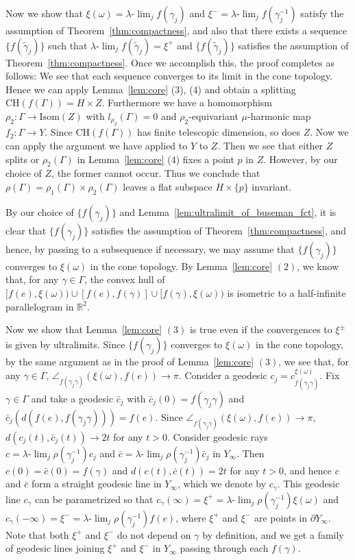 \documentclass[12pt]{amsart}
\numberwithin{equation}{section}
\theoremstyle{plain}
\theoremstyle{definition}
\theoremstyle{remark}
\newcommand{\R}{{\mathbb R}}
\newcommand{\isom}[1]{\mathrm{Isom}({#1})}
\newcommand{\ulim}{\lambda{\text{-}}\!\lim}
\newcommand{\ray}[1]{[#1)}
\newcommand{\cc}[2]{c_{#1}^{#2}}
\newcommand{\ch}[1]{\mathrm{CH}(#1)}
\begin{document}
 Now we show that $\xi(\omega)=\ulim_j f(\gamma_j)$ and 
 $\xi^-=\ulim_j f(\gamma_j^{-1})$
 satisfy the assumption of Theorem~\ref{thm:compactness}, and also that 
 there exists a sequence $\{f(\tilde \gamma_j)\}$ such that 
 $\ulim_j f(\tilde \gamma_j)=\xi^+$ and $\{f(\tilde \gamma_j)\}$
 satisfies the assumption of Theorem~\ref{thm:compactness}. 
 Once we accomplish this, the proof completes as follows:  
 We see that each sequence converges to its limit in the cone topology.
 Hence we can apply Lemma~\ref{lem:core} (3), (4) and 
 obtain a splitting $\ch{f(\Gamma)}=H\times Z$.
 Furthermore we have a homomorphism 
 $\rho_2\colon \Gamma \rightarrow \isom{Z}$ with $l_{\rho_2}(\Gamma)=0$
 and $\rho_2$-equivariant $\mu$-harmonic map 
 $f_2 \colon \Gamma \rightarrow Y$. 
 Since $\ch{f(\Gamma)}$ has finite telescopic dimension, so does $Z$.
 Now we can apply the argument we have applied to $Y$ to $Z$.
 Then we see that either $Z$ splits or $\rho_2(\Gamma)$ in
 Lemma~\ref{lem:core} (4) fixes a point $p$ in $Z$.
 However, by our choice of $Z$, the former cannot occur. 
 Thus we conclude that 
 $\rho(\Gamma)=\rho_1(\Gamma)\times \rho_2(\Gamma)$ leaves 
 a flat subspace $H\times \{p\}$ invariant.

 By our choice of $\{f(\gamma_j)\}$ and
 Lemma~\ref{lem:ultralimit_of_buseman_fct}, it is clear that 
 $\{f(\gamma_j)\}$ satisfies the assumption of
 Theorem~\ref{thm:compactness}, and hence, by passing to a subsequence
 if necessary, we may assume that $\{f(\gamma_j)\}$ converges to
 $\xi(\omega)$ in the cone topology. 
 By Lemma~\ref{lem:core} $(2)$, we know that, for any
 $\gamma \in \Gamma$, the convex hull of 
 $\ray{f(e),\xi(\omega)}\cup [f(e),f(\gamma)]\cup
 \ray{f(\gamma),\xi(\omega)}$ 
 is isometric to a half-infinite parallelogram in $\R^2$.

 Now we show that Lemma~\ref{lem:core} $(3)$ is true even if the
 convergences to $\xi^{\pm}$ is given by ultralimits.
 Since $\{f(\gamma_j)\}$ converges to $\xi(\omega)$ in the cone
  topology, by the same argument as in the proof of Lemma~\ref{lem:core}
 $(3)$,
 we see that, for any $\gamma \in\Gamma$, 
 $\angle_{f(\gamma_{j} \gamma)} (\xi(\omega),f(e))\to \pi$. 
 Consider a geodesic 
 $c_j=\cc{f(\gamma_j\gamma)}{\xi(\omega)}$.
 Fix $\gamma \in \Gamma$ and 
 take a geodesic $\bar c_j$ with $\bar c_j(0)=f(\gamma_j \gamma)$ and 
 $\bar c_j(d(f(e),f(\gamma_j \gamma)))=f(e)$. 
 Since $\angle_{f(\gamma_{j} \gamma)} (\xi(\omega),f(e))\to \pi$, 
 $d(c_j(t), \bar c_j(t)) \to 2t$ for any $t>0$. 
 Consider geodesic rays  $c=\ulim_j \rho(\gamma_j^{-1})c_j$ and 
 $\bar c = \ulim_j \rho(\gamma_j^{-1})\bar c_j$ in $Y_{\infty}$. 
 Then $c(0)=\bar c(0)=f(\gamma)$ and $d(c(t),\bar c(t))=2t$ for any 
 $t>0$, and hence $c$ and $\bar c$ form a straight geodesic line in
 $Y_{\infty}$, which we denote by $c_{\gamma}$. 
 This geodesic line $c_{\gamma}$ can be parametrized so that
 $c_{\gamma}(\infty)=\xi^+ = \ulim_j \rho(\gamma_j^{-1})\xi(\omega)$ and 
 $c_{\gamma}(-\infty)=\xi^- = \ulim_j \rho(\gamma_j^{-1})f(e)$, where 
 $\xi^+$ and $\xi^-$ are points in $\partial Y_{\infty}$.  
 Note that both $\xi^+$ and $\xi^-$ do not depend on $\gamma$ by
 definition, and we get a family of geodesic lines joining $\xi^+$ and
 $\xi^-$ in $Y_{\infty}$ passing through each $f(\gamma)$. 
\end{document}
